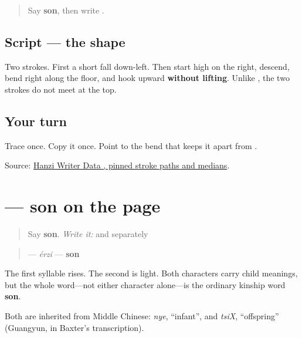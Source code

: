 \label{lesson:ZH-W12-er}



\begin{quote}
Say \textbf{son}, then write .
\end{quote}

\subsection*{Script — the shape}

\begin{quote}
\textbf{}
\end{quote}

Two strokes. First a short fall down-left. Then start high on the right, descend, bend right along the floor, and hook upward \textbf{without lifting}. Unlike , the two strokes do not meet at the top.

\subsection*{Your turn}
Trace \textbf{} once. Copy it once. Point to the bend that keeps it apart from .

\begin{tcolorbox}[breakable,colback=teal!4,colframe=teal!35!black,title={Before you move on}]
Source: \href{https://raw.githubusercontent.com/chanind/hanzi-writer-data/68d10a4b21150cae5e1ebbd223eed289cf32d90c/data/\%E5\%84\%BF.json}{Hanzi Writer Data , pinned stroke paths and medians}.
\end{tcolorbox}
\section[\texorpdfstring{\zh{儿子} (érzi)}{儿子 (érzi)}]{ — son on the page}

\label{lesson:ZH-C12-erzi}



\begin{quote}
Say \textbf{son}. \emph{Write it:}  and  separately
\end{quote}

\begin{cousinweb}
\begin{quote}
\textbf{} — \emph{érzi} — \textbf{son}
\end{quote}

The first syllable rises. The second is light. Both characters carry child meanings, but the whole word—not either character alone—is the ordinary kinship word \textbf{son}.

Both are inherited from Middle Chinese: \emph{nye}, \textquotedblleft{}infant\textquotedblright{}, and \emph{tsiX}, \textquotedblleft{}offspring\textquotedblright{} (Guangyun, in Baxter's transcription).
\end{cousinweb}

